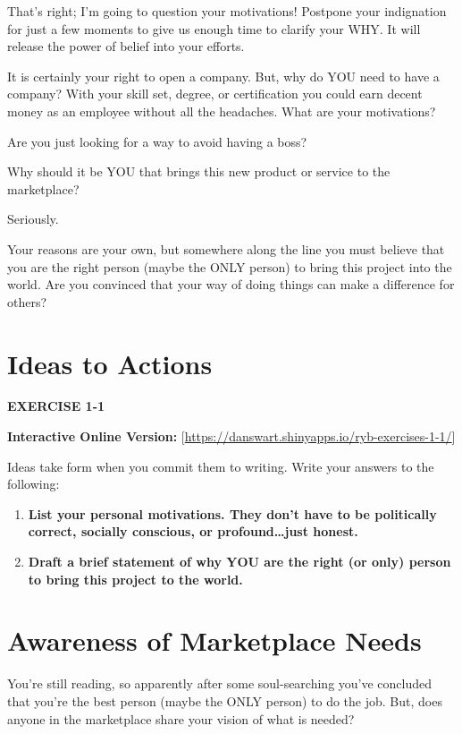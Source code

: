 \documentclass[
]{book}
\begin{document}
That's right; I'm going to question your motivations! Postpone your indignation for just a few moments to give us enough time to clarify your WHY. It will release the power of belief into your efforts.

It is certainly your right to open a company. But, why do YOU need to have a company? With your skill set, degree, or certification you could earn decent money as an employee without all the headaches. What are your motivations?

Are you just looking for a way to avoid having a boss?

Why should it be YOU that brings this new product or service to the marketplace?

Seriously.

Your reasons are your own, but somewhere along the line you must believe that you are the right person (maybe the ONLY person) to bring this project into the world. Are you convinced that your way of doing things can make a difference for others?

\hypertarget{ideas-to-actions}{%
\section{Ideas to Actions}\label{ideas-to-actions}}

\textbf{EXERCISE 1-1}

{\textbf{Interactive Online Version:}} {[}\url{https://danswart.shinyapps.io/ryb-exercises-1-1/}{]}

Ideas take form when you commit them to writing. Write your answers to the following:

\begin{enumerate}
\def\labelenumi{\arabic{enumi}.}
\item
  \textbf{List your personal motivations. They don't have to be politically correct, socially conscious, or profound\ldots just honest.}
\item
  \textbf{Draft a brief statement of why YOU are the right (or only) person to bring this project to the world.}
\end{enumerate}

\hypertarget{awareness-of-marketplace-needs}{%
\section{Awareness of Marketplace Needs}\label{awareness-of-marketplace-needs}}

You're still reading, so apparently after some soul-searching you've concluded that you're the best person (maybe the ONLY person) to do the job. But, does anyone in the marketplace share your vision of what is needed?
\end{document}
